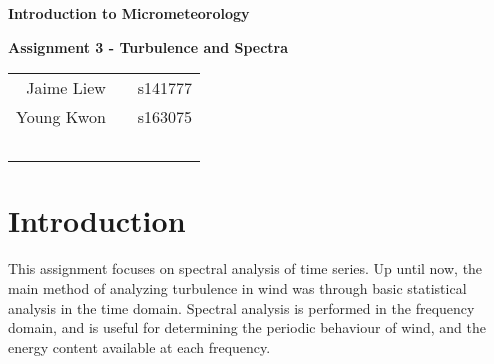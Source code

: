 \documentclass[11pt]{article}
\begin{document}
\setcounter{page}{1}
\begin{Large}\begin{center}
\textbf{Introduction to Micrometeorology}

\textbf{Assignment 3 - Turbulence and Spectra}
\end{center}\end{Large}

\begin{center}
\begin{tabular}{rcl}
Jaime Liew && s141777 \\ 
Young Kwon && s163075 \\~\\
\end{tabular}
\end{center}

\section{Introduction}
This assignment focuses on spectral analysis of time series. Up until now, the main method of analyzing turbulence in wind was through basic statistical analysis in the time domain. Spectral analysis is performed in the frequency domain, and is useful for determining the periodic behaviour of wind, and the energy content available at each frequency. 
\end{document}
